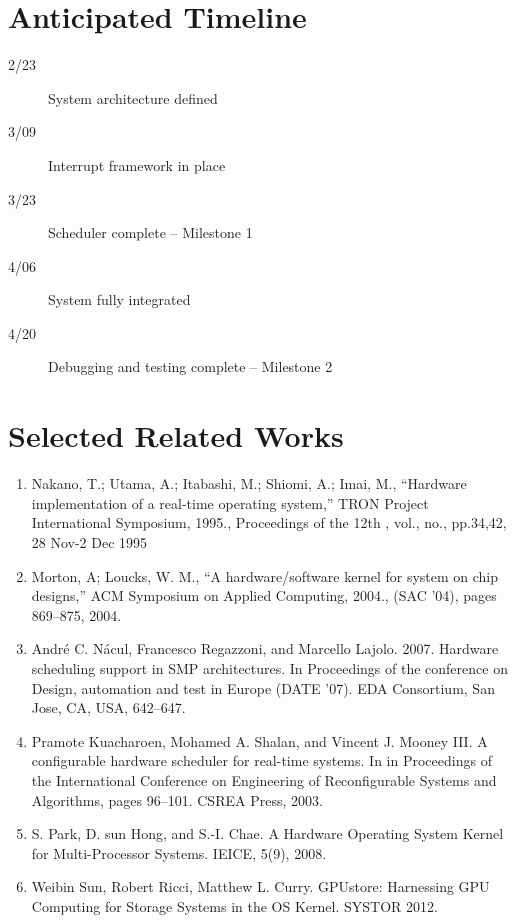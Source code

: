 \documentclass[twocolumn]{article}
\begin{document}
\section*{Anticipated Timeline}
\begin{description}
\item[2/23] System architecture defined
\item[3/09] Interrupt framework in place
\item[3/23] Scheduler complete -- Milestone 1
\item[4/06] System fully integrated
\item[4/20] Debugging and testing complete -- Milestone 2
\end{description}


\section*{Selected Related Works}
\renewcommand{\theenumi}{[\arabic{enumi}]}
\begin{enumerate}
\item Nakano, T.; Utama, A.; Itabashi, M.; Shiomi, A.; Imai, M., ``Hardware implementation of a real-time operating system,'' TRON Project International Symposium, 1995., Proceedings of the 12th , vol., no., pp.34,42, 28 Nov-2 Dec 1995

\item Morton, A; Loucks, W. M., ``A hardware/software kernel for system on chip designs,'' ACM Symposium on Applied Computing, 2004., (SAC ’04), pages 869--875, 2004.

\item André C. Nácul, Francesco Regazzoni, and Marcello Lajolo. 2007. Hardware scheduling support in SMP architectures. In Proceedings of the conference on Design, automation and test in Europe (DATE '07). EDA Consortium, San Jose, CA, USA, 642--647.

\item Pramote Kuacharoen, Mohamed A. Shalan, and Vincent J. Mooney III. A configurable hardware scheduler for real-time systems. In in Proceedings of the International Conference on Engineering of Reconfigurable Systems and Algorithms, pages 96--101. CSREA Press, 2003.

\item S. Park, D. sun Hong, and S.-I. Chae.  A Hardware Operating System Kernel for Multi-Processor Systems. IEICE, 5(9), 2008.

\item Weibin Sun, Robert Ricci, Matthew L. Curry.  GPUstore: Harnessing GPU Computing for Storage Systems in the OS Kernel.  SYSTOR 2012.

\end{enumerate}
\end{document}
